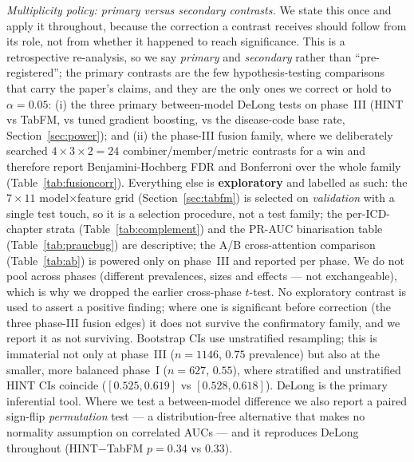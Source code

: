 \documentclass[a4paper,fleqn]{cas-sc}
\begin{document}
\emph{Multiplicity policy: primary versus secondary contrasts.} We state this
once and apply it throughout, because the correction a contrast receives should follow from its
role, not from whether it happened to reach significance. This is a retrospective re-analysis, so
we say \emph{primary} and \emph{secondary} rather than ``pre-registered''; the primary contrasts
are the few hypothesis-testing comparisons that carry the paper's claims, and they
are the only ones we correct or hold to $\alpha{=}0.05$: (i) the three primary between-model
DeLong tests on phase~III (HINT vs TabFM, vs tuned gradient boosting, vs the disease-code base
rate, Section~\ref{sec:power}); and (ii) the phase-III fusion family, where we deliberately
searched $4\times3\times2=24$ combiner/member/metric contrasts for a win and therefore report
Benjamini-Hochberg FDR and Bonferroni over the whole family (Table~\ref{tab:fusioncorr}).
Everything else is \textbf{exploratory} and labelled as such: the $7{\times}11$ model$\times$feature
grid (Section~\ref{sec:tabfm}) is selected on \emph{validation} with a single test touch, so it
is a selection procedure, not a test family; the per-ICD-chapter strata
(Table~\ref{tab:complement}) and the PR-AUC binarisation table (Table~\ref{tab:praucbug}) are
descriptive; the A/B cross-attention comparison (Table~\ref{tab:ab}) is powered only on
phase~III and reported per phase. We do not pool across phases (different prevalences, sizes and
effects --- not exchangeable), which is why we dropped the earlier cross-phase $t$-test. No
exploratory contrast is used to assert a positive finding; where one is significant before
correction (the three phase-III fusion edges) it does not survive the confirmatory family, and
we report it as not surviving. Bootstrap CIs use unstratified resampling; this is immaterial
not only at phase~III ($n{=}1146$, $0.75$ prevalence) but also at the smaller, more balanced
phase~I ($n{=}627$, $0.55$), where stratified and unstratified HINT CIs coincide
($[0.525,0.619]$ vs $[0.528,0.618]$). DeLong is the primary inferential tool. Where we test a
between-model difference we also report a paired sign-flip \emph{permutation} test --- a
distribution-free alternative that makes no normality assumption on correlated AUCs --- and it
reproduces DeLong throughout (HINT$-$TabFM $p=0.34$ vs $0.33$).
\end{document}
